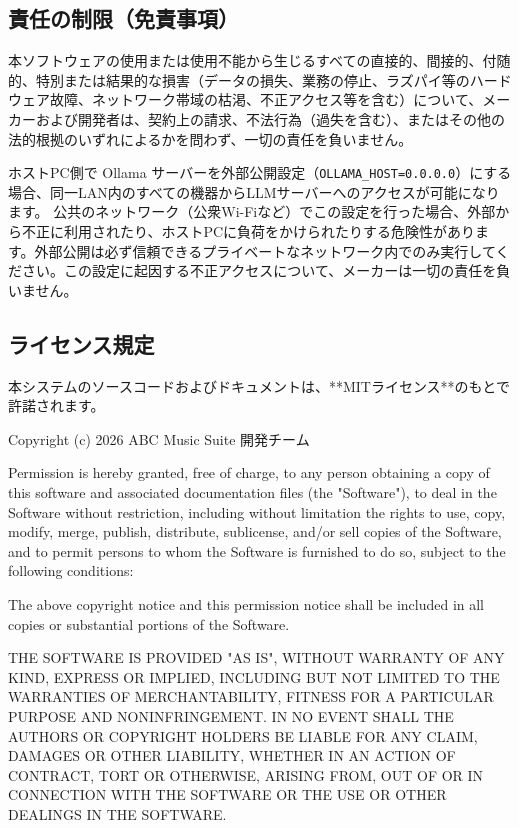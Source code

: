 \subsection{責任の制限（免責事項）}

本ソフトウェアの使用または使用不能から生じるすべての直接的、間接的、付随的、特別または結果的な損害（データの損失、業務の停止、ラズパイ等のハードウェア故障、ネットワーク帯域の枯渇、不正アクセス等を含む）について、メーカーおよび開発者は、契約上の請求、不法行為（過失を含む）、またはその他の法的根拠のいずれによるかを問わず、一切の責任を負いません。

\begin{tcolorbox}[warnbox, title=セキュリティに関するメーカーからの警告]
  ホストPC側で Ollama サーバーを外部公開設定（\texttt{OLLAMA\_HOST=0.0.0.0}）にする場合、同一LAN内のすべての機器からLLMサーバーへのアクセスが可能になります。
  公共のネットワーク（公衆Wi-Fiなど）でこの設定を行った場合、外部から不正に利用されたり、ホストPCに負荷をかけられたりする危険性があります。外部公開は必ず信頼できるプライベートなネットワーク内でのみ実行してください。この設定に起因する不正アクセスについて、メーカーは一切の責任を負いません。
\end{tcolorbox}

\subsection{ライセンス規定}

本システムのソースコードおよびドキュメントは、**MITライセンス**のもとで許諾されます。

\begin{tcolorbox}[mybox, title=MIT License]
\small
\ttfamily
Copyright (c) 2026 ABC Music Suite 開発チーム

Permission is hereby granted, free of charge, to any person obtaining a copy
of this software and associated documentation files (the "Software"), to deal
in the Software without restriction, including without limitation the rights
to use, copy, modify, merge, publish, distribute, sublicense, and/or sell
copies of the Software, and to permit persons to whom the Software is
furnished to do so, subject to the following conditions:

The above copyright notice and this permission notice shall be included in all
copies or substantial portions of the Software.

THE SOFTWARE IS PROVIDED "AS IS", WITHOUT WARRANTY OF ANY KIND, EXPRESS OR
IMPLIED, INCLUDING BUT NOT LIMITED TO THE WARRANTIES OF MERCHANTABILITY,
FITNESS FOR A PARTICULAR PURPOSE AND NONINFRINGEMENT. IN NO EVENT SHALL THE
AUTHORS OR COPYRIGHT HOLDERS BE LIABLE FOR ANY CLAIM, DAMAGES OR OTHER
LIABILITY, WHETHER IN AN ACTION OF CONTRACT, TORT OR OTHERWISE, ARISING FROM,
OUT OF OR IN CONNECTION WITH THE SOFTWARE OR THE USE OR OTHER DEALINGS IN THE
SOFTWARE.
\end{tcolorbox}
